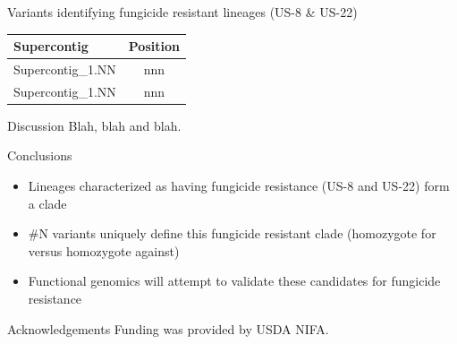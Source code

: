 \documentclass[final,t]{beamer}
\begin{document}
\begin{frame}{}
\begin{columns}[t]
\begin{column}{.28\linewidth}
  \begin{block}{Variants identifying fungicide resistant lineages (US-8 \& US-22)}
    \begin{table}
    \begin{tabular}{lc}
      \hline
        \textbf{Supercontig} & \textbf{Position} \\
      \hline
        Supercontig\_1.NN & nnn \\
        Supercontig\_1.NN & nnn \\
      \hline
    \end{tabular}
    \end{table}

  \end{block}
      
  \begin{block}{Discussion}
    Blah, blah and blah.

  \end{block}

                
      \begin{block}{Conclusions}
        \begin{itemize}
        \item Lineages characterized as having fungicide resistance (US-8 and US-22) form a clade
        \item \#N variants uniquely define this fungicide resistant clade (homozygote for versus homozygote against)
        \item Functional genomics will attempt to validate these candidates for fungicide resistance
        \end{itemize}
        \vspace{-1ex}
      \end{block}

      \begin{block}{Acknowledgements}
Funding was provided by USDA NIFA.
      \end{block}

    \end{column}
  \end{columns}
\end{frame}
\end{document}

